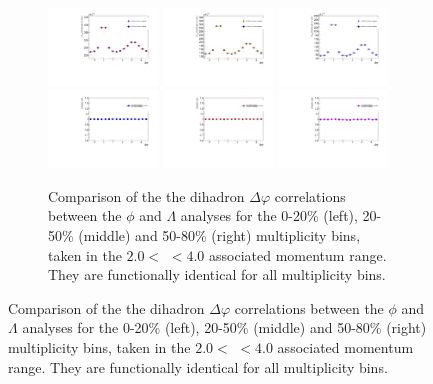 \begin{figure}
\begin{figure}[ht]
    \includegraphics[width=0.32\textwidth]{figures/analysis/h_h_dphi_0_20_justin_ryan_comparison.pdf}
    \includegraphics[width=0.32\textwidth]{figures/analysis/h_h_dphi_20_50_justin_ryan_comparison.pdf}
    \includegraphics[width=0.32\textwidth]{figures/analysis/h_h_dphi_50_80_justin_ryan_comparison.pdf}
    \includegraphics[width=0.32\textwidth]{figures/analysis/justin_ryan_ratio_0_20}
    \includegraphics[width=0.32\textwidth]{figures/analysis/justin_ryan_ratio_20_50}
    \includegraphics[width=0.32\textwidth]{figures/analysis/justin_ryan_ratio_50_80}
    \caption{Comparison of the the dihadron $\Delta\varphi$ correlations between the $\phi$ and $\Lambda$ analyses for the 0-20\% (left), 20-50\% (middle) and 50-80\% (right) multiplicity bins, taken in the $2.0 <$ \pt $< 4.0$ \GeVc associated momentum range. They are functionally identical for all multiplicity bins.}
    \label{fig:dihadron_comp}
\end{figure}


\end{figure}
